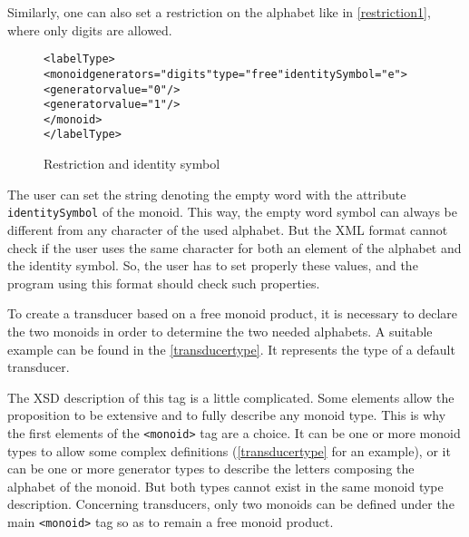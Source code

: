 \documentclass[a4paper]{article}
\newcommand{\xtag}[1]{\texttt{<#1>}}
\newcommand{\xattr}[1]{\texttt{#1}}
\begin{document}
Similarly, one can also set a restriction on the alphabet like in
\autoref{restriction1}, where only digits are allowed.

\begin{figure}[ht]
  \small
  \begin{center}
\begin{alltt}
<labelType>
  <monoid generators="digits" type="free" identitySymbol="e">
    <generator value="0"/>
    <generator value="1"/>
  </monoid>
</labelType>
\end{alltt}

\caption{Restriction and identity symbol}
\label{restriction1}
  \end{center}
\end{figure}


The user can set the string denoting the empty word with the attribute
\xattr{identitySymbol} of the monoid. This way, the empty word
symbol can always be different from any character of the used
alphabet. But the XML format cannot check if the user uses the same character
for both an element of the alphabet and the identity symbol. So, the user has
to set properly these values, and the program using this format should check
such properties.

To create a transducer based on a free monoid product, it is necessary
to declare the two monoids in order to determine the two needed
alphabets. A suitable example can be found in the
\autoref{transducertype}. It represents the type of a default
transducer.

The XSD description of this tag is a little complicated. Some elements
allow the proposition to be extensive and to fully describe any monoid
type. This is why the first elements of the \xtag{monoid} tag are a
choice. It can be one or more monoid types to allow some complex
definitions (\autoref{transducertype} for an example), or it can
be one or more generator types to describe the letters composing the
alphabet of the monoid. But both types cannot exist in the same monoid
type description. Concerning transducers, only two monoids can be
defined under the main \xtag{monoid} tag so as to remain a free monoid
product.
\end{document}
